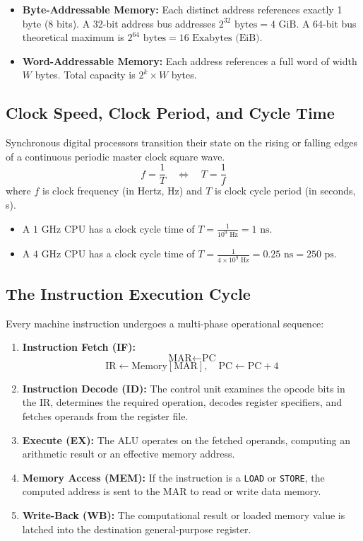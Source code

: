 \begin{itemize}
    \item \textbf{Byte-Addressable Memory:} Each distinct address references exactly 1 byte (8 bits). A 32-bit address bus addresses $2^{32} \text{ bytes} = 4\text{ GiB}$. A 64-bit bus theoretical maximum is $2^{64} \text{ bytes} = 16\text{ Exabytes (EiB)}$.
    \item \textbf{Word-Addressable Memory:} Each address references a full word of width $W$ bytes. Total capacity is $2^k \times W$ bytes.
\end{itemize}

\subsection{Clock Speed, Clock Period, and Cycle Time}
Synchronous digital processors transition their state on the rising or falling edges of a continuous periodic master clock square wave.
\begin{equation}
\label{eq:clock_frequency}
f = \frac{1}{T} \quad \Longleftrightarrow \quad T = \frac{1}{f}
\end{equation}
where $f$ is clock frequency (in Hertz, Hz) and $T$ is clock cycle period (in seconds, s).
\begin{itemize}
    \item A $1\text{ GHz}$ CPU has a clock cycle time of $T = \frac{1}{10^9\text{ Hz}} = 1\text{ ns}$.
    \item A $4\text{ GHz}$ CPU has a clock cycle time of $T = \frac{1}{4 \times 10^9\text{ Hz}} = 0.25\text{ ns} = 250\text{ ps}$.
\end{itemize}

\subsection{The Instruction Execution Cycle}
Every machine instruction undergoes a multi-phase operational sequence:
\begin{enumerate}[label=\bfseries\arabic*.]
    \item \textbf{Instruction Fetch (IF):}
    \[ \text{MAR} \leftarrow \text{PC} \]
    \[ \text{IR} \leftarrow \text{Memory}[\text{MAR}], \quad \text{PC} \leftarrow \text{PC} + 4 \]
    \item \textbf{Instruction Decode (ID):} The control unit examines the opcode bits in the IR, determines the required operation, decodes register specifiers, and fetches operands from the register file.
    \item \textbf{Execute (EX):} The ALU operates on the fetched operands, computing an arithmetic result or an effective memory address.
    \item \textbf{Memory Access (MEM):} If the instruction is a \texttt{LOAD} or \texttt{STORE}, the computed address is sent to the MAR to read or write data memory.
    \item \textbf{Write-Back (WB):} The computational result or loaded memory value is latched into the destination general-purpose register.
\end{enumerate}

